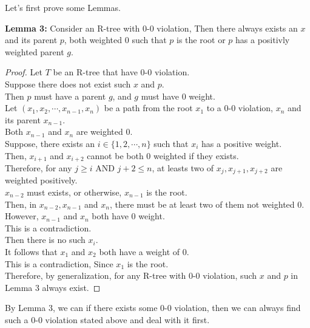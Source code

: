 \documentclass[10pt]{article}
\newcommand{\aand}{\mbox{ AND }}
\begin{document}
\begin{enumerate}
	Let's first prove some Lemmas.

	\textbf{Lemma 3:} Consider an R-tree with 0-0 violation, Then there always exists an $x$ and its parent $p$, both weighted 0 such that $p$ is the root or $p$ has a positivly weighted parent $g$. \\
	\begin{proof}
	Let $T$ be an R-tree that have 0-0 violation. \\
	Suppose there does not exist such $x$ and $p$. \\
	Then $p$ must have a parent $g$, and $g$ must have 0 weight. \\
	Let $(x_1, x_2, \cdots, x_{n-1}, x_{n})$ be a path from the root $x_1$ to a 0-0 violation, $x_{n}$ and its parent $x_{n-1}$. \\
	Both $x_{n-1}$ and $x_{n}$ are weighted 0. \\
	Suppose, there exists an $i \in \{1, 2, \cdots, n\}$ such that $x_{i}$ has a positive weight. \\
	Then, $x_{i+1}$ and $x_{i+2}$ cannot be both 0 weighted if they exists. \\
	Therefore, for any $j \geq i \aand j+2 \leq n$, at leasts two of $x_{j}, x_{j+1}, x_{j+2}$ are weighted positively. \\
	$x_{n-2}$ must exists, or otherwise, $x_{n-1}$ is the root. \\
	Then, in $x_{n-2}, x_{n-1}$ and $x_{n}$, there must be at least two of them not weighted 0. \\
	However, $x_{n-1}$ and $x_{n}$ both have 0 weight. \\
	This is a contradiction. \\
	Then there is no such $x_{i}$. \\
	It follows that $x_{1}$ and $x_{2}$ both have a weight of 0. \\
	This is a contradiction, Since $x_{1}$ is the root. \\
	Therefore, by generalization, for any R-tree with 0-0 violation, such $x$ and $p$ in Lemma 3 always exist. 
	\end{proof}

	By Lemma 3, we can if there exists some 0-0 violation, then we can always
	find such a 0-0 violation stated above and deal with it first. \\


\end{enumerate}
\end{document}
